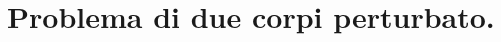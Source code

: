 \section{Problema di due corpi perturbato.}
\label{ElementiDiMeccanicaCeleste_ProblemaDiDueCorpiPerturbato}
